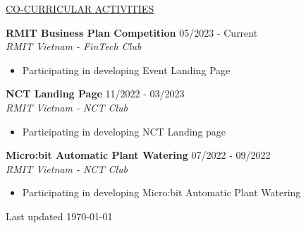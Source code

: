 \documentclass[11pt]{article}
\newcommand{\betteruline}[1]{
    \uline{#1}
}
\newcommand{\sectiontitle}[1]{
    \begingroup
        \titlebold
        \betteruline{\Large\uppercase{#1}  }
        \vspace{1.7mm}
    \endgroup
}
\newcommand{\sectioncontent}[1]{
    \begingroup
        \begin{FlushLeft}
        \vspace{-3mm}
        \sffamily\small#1
        \end{FlushLeft}
    \endgroup
    \vspace{2mm}
}
\newcommand{\project}[2]{
    \begingroup
        \textbf{\small#1}
        \hfill\color{black!70}\small{#2}
    \endgroup
}
\newcommand{\spacevv}{
    \vspace{2mm}
}
\begin{document}
\begin{paracol}{2}
    \sectiontitle{CO-CURRICULAR ACTIVITIES}
    \sectioncontent{
    \vspace{1mm}

            \project{RMIT Business Plan Competition}{05/2023 - Current} \\
          \textcolor{black!70}{\textit{RMIT Vietnam - FinTech Club}}
          \vspace{1mm} 
          \begin{itemize}
            \item Participating in developing Event Landing Page 
          \end{itemize}
          \spacevv
          
          \project{NCT Landing Page}{11/2022 - 03/2023} \\
          \textcolor{black!70}{\textit{RMIT Vietnam - NCT Club}}
          \vspace{1mm} 
          \begin{itemize}
            \item Participating in developing NCT Landing page 
          \end{itemize}
          \spacevv

          \project{Micro:bit Automatic Plant Watering}{07/2022 - 09/2022} \\
          \textcolor{black!70}{\textit{RMIT Vietnam - NCT Club}}
          \vspace{1mm} 
          \begin{itemize}
            \item Participating in developing Micro:bit Automatic Plant Watering
          \end{itemize}
          \spacevv
    
    }

    \normaltext \hfill \tiny Last updated \today

    \end{paracol}
\end{document}

